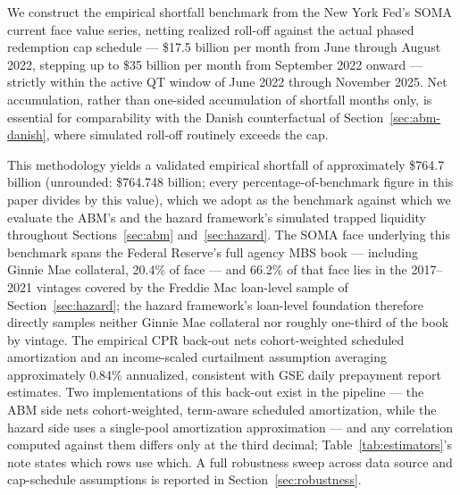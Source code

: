 \documentclass[12pt]{article}
\begin{document}
We construct the empirical shortfall benchmark from the New York Fed's SOMA current face value series, netting realized roll-off against the actual phased redemption cap schedule --- \$17.5 billion per month from June through August 2022, stepping up to \$35 billion per month from September 2022 onward --- strictly within the active QT window of June 2022 through November 2025. Net accumulation, rather than one-sided accumulation of shortfall months only, is essential for comparability with the Danish counterfactual of Section~\ref{sec:abm-danish}, where simulated roll-off routinely exceeds the cap.

This methodology yields a validated empirical shortfall of approximately \$764.7 billion (unrounded: \$764.748 billion; every percentage-of-benchmark figure in this paper divides by this value), which we adopt as the benchmark against which we evaluate the ABM's and the hazard framework's simulated trapped liquidity throughout Sections~\ref{sec:abm} and~\ref{sec:hazard}. The SOMA face underlying this benchmark spans the Federal Reserve's full agency MBS book --- including Ginnie Mae collateral, 20.4\% of face --- and 66.2\% of that face lies in the 2017--2021 vintages covered by the Freddie Mac loan-level sample of Section~\ref{sec:hazard}; the hazard framework's loan-level foundation therefore directly samples neither Ginnie Mae collateral nor roughly one-third of the book by vintage. The empirical CPR back-out nets cohort-weighted scheduled amortization and an income-scaled curtailment assumption averaging approximately 0.84\% annualized, consistent with GSE daily prepayment report estimates. Two implementations of this back-out exist in the pipeline --- the ABM side nets cohort-weighted, term-aware scheduled amortization, while the hazard side uses a single-pool amortization approximation --- and any correlation computed against them differs only at the third decimal; Table~\ref{tab:estimators}'s note states which rows use which. A full robustness sweep across data source and cap-schedule assumptions is reported in Section~\ref{sec:robustness}.
\end{document}
